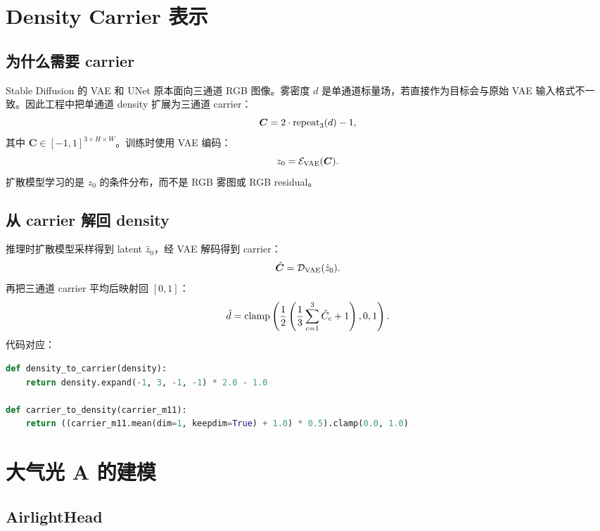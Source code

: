 \documentclass[11pt,a4paper]{ctexart}
\begin{document}
\section{Density Carrier 表示}

\subsection{为什么需要 carrier}

Stable Diffusion 的 VAE 和 UNet 原本面向三通道 RGB 图像。雾密度 $d$ 是单通道标量场，若直接作为目标会与原始 VAE 输入格式不一致。因此工程中把单通道 density 扩展为三通道 carrier：
\begin{equation}
  \bm{C} = 2\cdot {\rm repeat}_3(d) - 1,
  \label{eq:carrier}
\end{equation}
其中 $\bm{C}\in[-1,1]^{3\times H\times W}$。训练时使用 VAE 编码：
\begin{equation}
  z_0 = \mathcal{E}_{\rm VAE}(\bm{C}).
  \label{eq:vae_encode}
\end{equation}
扩散模型学习的是 $z_0$ 的条件分布，而不是 RGB 雾图或 RGB residual。

\subsection{从 carrier 解回 density}

推理时扩散模型采样得到 latent $\hat{z}_0$，经 VAE 解码得到 carrier：
\begin{equation}
  \hat{\bm{C}} = \mathcal{D}_{\rm VAE}(\hat{z}_0).
\end{equation}
再把三通道 carrier 平均后映射回 $[0,1]$：
\begin{equation}
  \hat{d} =
  {\rm clamp}\left(
    \frac{1}{2}\left(\frac{1}{3}\sum_{c=1}^3 \hat{C}_c + 1\right),
    0,1
  \right).
  \label{eq:carrier_to_density}
\end{equation}
代码对应：
\begin{lstlisting}[language=Python]
def density_to_carrier(density):
    return density.expand(-1, 3, -1, -1) * 2.0 - 1.0

def carrier_to_density(carrier_m11):
    return ((carrier_m11.mean(dim=1, keepdim=True) + 1.0) * 0.5).clamp(0.0, 1.0)
\end{lstlisting}

\section{大气光 A 的建模}

\subsection{AirlightHead}
\end{document}
